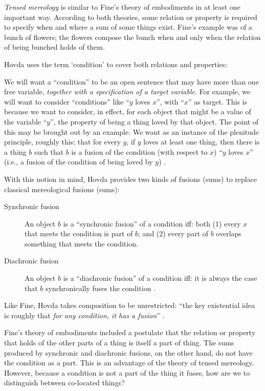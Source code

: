 \documentclass[11pt]{article}
\newenvironment{squote}{%
\begin{spacing}{1}
\begin{list}{}{%
\setlength{\labelwidth}{0pt}%
\rightmargin\leftmargin%
}
\item\relax
}{%
\end{list}%
\end{spacing}
}
\begin{document}
\begin{spacing}{1.5}
{\em Tensed mereology} is similar to Fine's theory of embodiments in
at least one important way.  According to both theories, some relation
or property is required to specify when and where a sum of some things
exist.  Fine's example was of a bunch of flowers; the flowers compose
the bunch when and only when the relation of being bunched holds of
them.

Hovda uses the term `condition' to cover both relations and
properties:

\begin{squote}
We will want a ``condition'' to be an open sentence that may have more
than one free variable, \emph{together with a specification of a
  target variable}. For example, we will want to consider
``conditions'' like ``$y$ loves $x$'', with ``$x$'' as target.  This
is because we want to consider, in effect, for each object that might
be a value of the variable ``$y$'', the property of being a thing
loved by that object.  The point of this may be brought out by an
example.  We want as an instance of the plenitude principle, roughly
this: that for every $y$, if $y$ loves at least one thing, then there
is a thing $b$ such that $b$ is a fusion of the condition (with
respect to $x$) ``$y$ loves $x$'' (i.e., a fusion of the condition of
being loved by $y$) \citeyearpar[??n2]{hovda2011}.
\end{squote}

With this notion in mind, Hovda provides two kinds of fusions (sums) to
replace classical mereological fusions (sums):

\begin{description}
  \item[Synchronic fusion] An object $b$ is a ``synchronic fusion'' of
    a condition iff: both (1) every $x$ that meets the condition is
    part of $b$; and (2) every part of $b$ overlaps something that
    meets the condition.
  \item[Diachronic fusion] An object $b$ is a ``diachronic fusion'' of
    a condition iff: it is always the case that $b$ synchronically
    fuses the condition \citeyearpar[??]{hovda2011}.
\end{description}

Like Fine, Hovda takes composition to be unrestricted: ``the key
existential idea is roughly that \emph{for any condition, it has a
  fusion}'' \citeyearpar[??]{hovda2011}.

Fine's theory of embodiments included a postulate that the relation or
property that holds of the other parts of a thing is itself a part of
thing.  The sums produced by synchronic and diachronic fusions, on the
other hand, do not have the condition as a part.  This is an advantage
of the theory of tensed mereology.  However, because a condition is
not a part of the thing it fuses, how are we to distinguish between
co-located things?  


\end{spacing}
\end{document}
